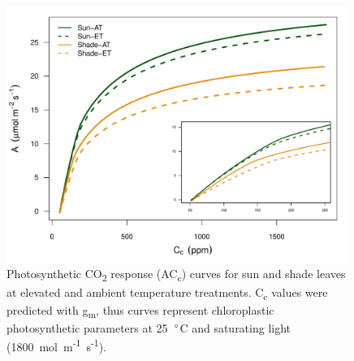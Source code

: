 \documentclass[a4paper]{article}\usepackage[]{graphicx}\usepackage[]{color}
\begin{document}
\begin{figure}[h!]
    \centering
    \includegraphics[width=0.99\textwidth]{Acc_model.pdf}
    \caption{Photosynthetic CO\textsubscript{2} response (AC\textsubscript{c}) curves for sun and shade leaves at elevated and ambient temperature treatments. C\textsubscript{c} values were predicted with g\textsubscript{m}, thus curves represent chloroplastic photosynthetic parameters at 25~$\degree$C and saturating light (1800~{\textmugreek}mol~m\textsuperscript{-1}~s\textsuperscript{-1}). }
    \label{fig:figure 3.S2}
\end{figure}
\end{document}
